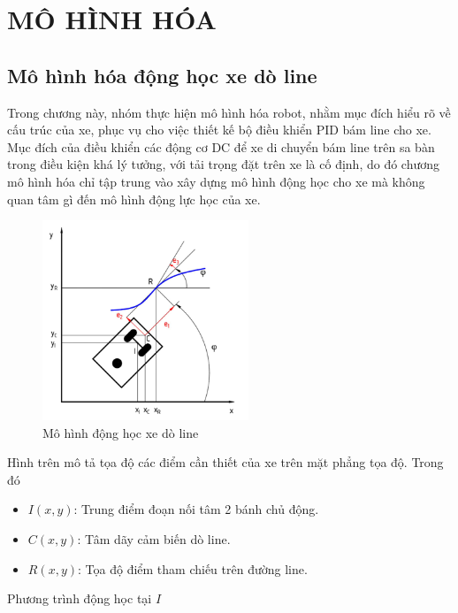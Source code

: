 \chapter{MÔ HÌNH HÓA}
     \section{Mô hình hóa động học xe dò line}
          \hspace*{0.6cm}Trong chương này, nhóm thực hiện mô hình hóa robot, nhằm mục đích hiểu rõ về cấu trúc của xe, phục vụ cho việc thiết kế bộ điều khiển PID bám line cho xe.
          \newline
          \hspace*{0.6cm}Mục đích của điều khiển các động cơ DC để xe di chuyển bám line trên sa bàn trong điều kiện khá lý tưởng, với tải trọng đặt trên xe là cố định, do đó chương mô hình hóa chỉ tập trung vào xây dựng mô hình động học cho xe mà không quan tâm 
          gì đến mô hình động lực học của xe.
          \begin{figure}[H]
               \centering
               \includegraphics[width=0.55\textwidth]{pictures/chapter5/chapter5_pic1.png}
               \caption{Mô hình động học xe dò line}
               \label{kinematic_model}
          \end{figure}         
          Hình trên mô tả tọa độ các điểm cần thiết của xe trên mặt phẳng tọa độ. Trong đó
          \begin{itemize}
               \item $I(x, y)$: Trung điểm đoạn nối tâm 2 bánh chủ động.
               \item $C(x, y)$: Tâm dãy cảm biến dò line.
               \item $R(x, y)$: Tọa độ điểm tham chiếu trên đường line.
          \end{itemize}
          \hspace*{0.6cm}Phương trình động học tại $I$
